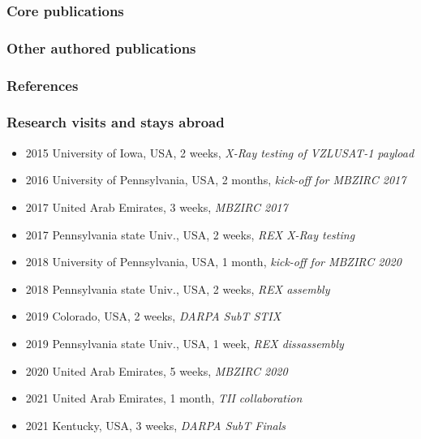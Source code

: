 \documentclass[aspectratio=169]{beamer}
\begin{document}


\DeclareCiteCommand{\fullcite}
{}
{%
  \usedriver
  {%
  }
{}}
{\multicitedelim}
{}

\begin{frame}
  \frametitle{Core publications}
  \tiny{
    \printbibliography[keyword={mine},keyword={phd_related},keyword={core},heading=none,title={}]
  }
\end{frame}

\begin{frame}[allowframebreaks]
  \frametitle{Other authored publications}
  \tiny{
    \printbibliography[keyword={mine},notkeyword={core},heading=none,title={}]
  }
\end{frame}

\begin{frame}[allowframebreaks]
  \frametitle{References}
  \tiny{
    \printbibliography[notkeyword={mine},notkeyword={core},heading=none,title={}]
  }
\end{frame}




\begin{frame}[noframenumbering]
\frametitle{Research visits and stays abroad}

  \begin{itemize}
    \item 2015 University of Iowa, USA, 2 weeks, \emph{X-Ray testing of VZLUSAT-1 payload}
    \item 2016 University of Pennsylvania, USA, 2 months, \emph{kick-off for MBZIRC 2017}
    \item 2017 United Arab Emirates, 3 weeks, \emph{MBZIRC 2017}
    \item 2017 Pennsylvania state Univ., USA, 2 weeks, \emph{REX X-Ray testing}
    \item 2018 University of Pennsylvania, USA, 1 month, \emph{kick-off for MBZIRC 2020}
    \item 2018 Pennsylvania state Univ., USA, 2 weeks, \emph{REX assembly}
    \item 2019 Colorado, USA, 2 weeks, \emph{DARPA SubT STIX}
    \item 2019 Pennsylvania state Univ., USA, 1 week, \emph{REX dissassembly}
    \item 2020 United Arab Emirates, 5 weeks, \emph{MBZIRC 2020}
    \item 2021 United Arab Emirates, 1 month, \emph{TII collaboration}
    \item 2021 Kentucky, USA, 3 weeks, \emph{DARPA SubT Finals}
  \end{itemize}

\end{frame}
\end{document}
